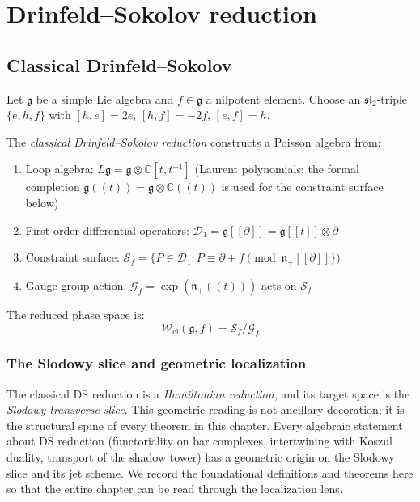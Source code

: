 \section{Drinfeld--Sokolov reduction}

\subsection{Classical Drinfeld--Sokolov}

\begin{definition}\label{def:classical-ds}
Let $\mathfrak{g}$ be a simple Lie algebra and $f \in \mathfrak{g}$ a nilpotent element. Choose an $\mathfrak{sl}_2$-triple $\{e, h, f\}$ with $[h,e] = 2e$, $[h,f] = -2f$, $[e,f] = h$.

The \emph{classical Drinfeld--Sokolov reduction} constructs a Poisson algebra from:
\begin{enumerate}
\item Loop algebra: $L\mathfrak{g} = \mathfrak{g} \otimes \mathbb{C}[t, t^{-1}]$ (Laurent polynomials; the formal completion $\mathfrak{g}((t)) = \mathfrak{g} \otimes \mathbb{C}((t))$ is used for the constraint surface below)
\item First-order differential operators: $\mathcal{D}_1 = \mathfrak{g}[[\partial]] = \mathfrak{g}[[t]] \otimes \partial$
\item Constraint surface: $\mathcal{S}_f = \{P \in \mathcal{D}_1 : P \equiv \partial + f \pmod{\mathfrak{n}_+[[\partial]]\}}$
\item Gauge group action: $\mathcal{G}_f = \exp(\mathfrak{n}_+((t)))$ acts on $\mathcal{S}_f$
\end{enumerate}

The reduced phase space is:
\begin{equation}
\mathcal{W}_{\text{cl}}(\mathfrak{g}, f) = \mathcal{S}_f / \mathcal{G}_f
\end{equation}
\end{definition}

\subsubsection{The Slodowy slice and geometric localization}
\label{sec:slodowy-geometric-localization}

The classical DS reduction is a \emph{Hamiltonian reduction}, and its
target space is the \emph{Slodowy transverse slice}.  This geometric
reading is not ancillary decoration; it is the structural spine of every
theorem in this chapter.  Every algebraic statement about DS reduction
(functoriality on bar complexes, intertwining with Koszul duality,
transport of the shadow tower) has a geometric origin on the Slodowy
slice and its jet scheme.  We record the foundational definitions and
theorems here so that the entire chapter can be read through the
localization lens.

